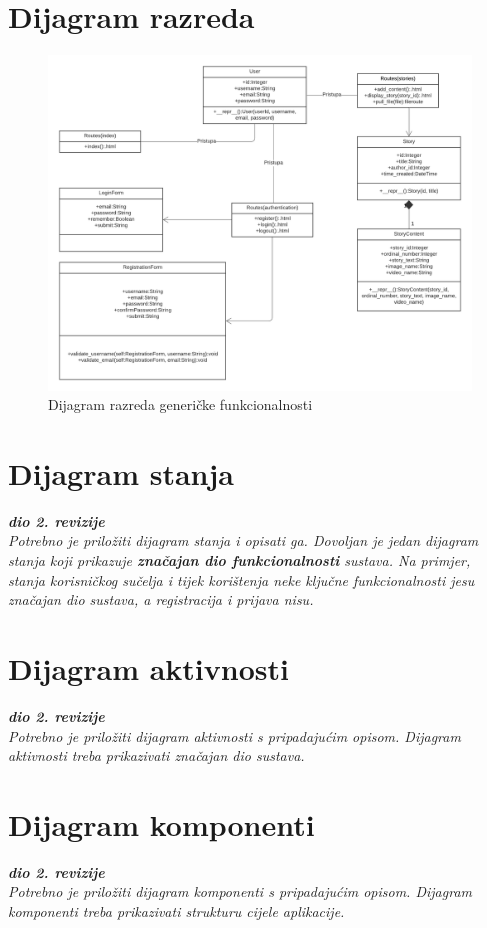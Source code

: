 			
		\section{Dijagram razreda}
		
			\begin{figure}[H]
						\includegraphics[width=.9\linewidth]{dijagrami/UML_class.PNG} %
						\caption{Dijagram razreda generičke funkcionalnosti}
						\label{fig:diraz1} %
					\end{figure}
		
		\section{Dijagram stanja}
			
			
			\textbf{\textit{dio 2. revizije}}\\
			
			\textit{Potrebno je priložiti dijagram stanja i opisati ga. Dovoljan je jedan dijagram stanja koji prikazuje \textbf{značajan dio funkcionalnosti} sustava. Na primjer, stanja korisničkog sučelja i tijek korištenja neke ključne funkcionalnosti jesu značajan dio sustava, a registracija i prijava nisu. }
			
			
			\eject 
		
		\section{Dijagram aktivnosti}
			
			\textbf{\textit{dio 2. revizije}}\\
			
			 \textit{Potrebno je priložiti dijagram aktivnosti s pripadajućim opisom. Dijagram aktivnosti treba prikazivati značajan dio sustava.}
			
			\eject
		\section{Dijagram komponenti}
		
			\textbf{\textit{dio 2. revizije}}\\
		
			 \textit{Potrebno je priložiti dijagram komponenti s pripadajućim opisom. Dijagram komponenti treba prikazivati strukturu cijele aplikacije.}
